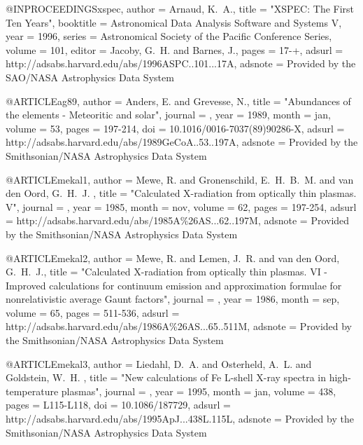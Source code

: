 @INPROCEEDINGS{xspec,
   author = {{Arnaud}, K.~A.},
    title = "{XSPEC: The First Ten Years}",
booktitle = {Astronomical Data Analysis Software and Systems V},
     year = 1996,
   series = {Astronomical Society of the Pacific Conference Series},
   volume = 101,
   editor = {{Jacoby}, G.~H. and {Barnes}, J.},
    pages = {17-+},
   adsurl = {http://adsabs.harvard.edu/abs/1996ASPC..101...17A},
  adsnote = {Provided by the SAO/NASA Astrophysics Data System}
}

@ARTICLE{ag89,
   author = {{Anders}, E. and {Grevesse}, N.},
    title = "{Abundances of the elements - Meteoritic and solar}",
  journal = {\gca},
     year = 1989,
    month = jan,
   volume = 53,
    pages = {197-214},
      doi = {10.1016/0016-7037(89)90286-X},
   adsurl = {http://adsabs.harvard.edu/abs/1989GeCoA..53..197A},
  adsnote = {Provided by the Smithsonian/NASA Astrophysics Data System}
}

@ARTICLE{mekal1,
   author = {{Mewe}, R. and {Gronenschild}, E.~H.~B.~M. and {van den Oord}, G.~H.~J.
   },
    title = "{Calculated X-radiation from optically thin plasmas. V}",
  journal = {\aaps},
     year = 1985,
    month = nov,
   volume = 62,
    pages = {197-254},
   adsurl = {http://adsabs.harvard.edu/abs/1985A\%26AS...62..197M},
  adsnote = {Provided by the Smithsonian/NASA Astrophysics Data System}
}

@ARTICLE{mekal2,
   author = {{Mewe}, R. and {Lemen}, J.~R. and {van den Oord}, G.~H.~J.},
    title = "{Calculated X-radiation from optically thin plasmas. VI - Improved calculations for continuum emission and approximation formulae for nonrelativistic average Gaunt factors}",
  journal = {\aaps},
     year = 1986,
    month = sep,
   volume = 65,
    pages = {511-536},
   adsurl = {http://adsabs.harvard.edu/abs/1986A\%26AS...65..511M},
  adsnote = {Provided by the Smithsonian/NASA Astrophysics Data System}
}

@ARTICLE{mekal3,
   author = {{Liedahl}, D.~A. and {Osterheld}, A.~L. and {Goldstein}, W.~H.
   },
    title = "{New calculations of Fe L-shell X-ray spectra in high-temperature plasmas}",
  journal = {\apjl},
     year = 1995,
    month = jan,
   volume = 438,
    pages = {L115-L118},
      doi = {10.1086/187729},
   adsurl = {http://adsabs.harvard.edu/abs/1995ApJ...438L.115L},
  adsnote = {Provided by the Smithsonian/NASA Astrophysics Data System}
}
